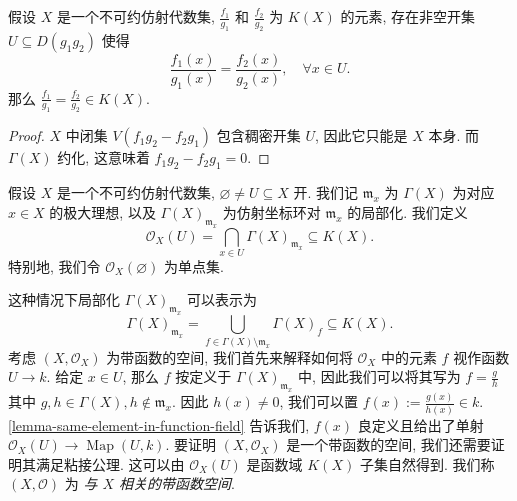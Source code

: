 \begin{lemma}
  \label{lemma-same-element-in-function-field}
  假设 \( X \) 是一个不可约仿射代数集, \( \frac{f_1}{g_1} \) 和 \(
  \frac{f_2}{g_2} \) 为 \( K(X) \) 的元素, 存在非空开集 \( U \subseteq
  D(g_1 g_2) \) 使得
  \[
    \frac{f_1(x)}{g_1(x)} = \frac{f_2(x)}{g_2(x)},\quad \forall x \in U.
  \]
  那么 \( \frac{f_1}{g_1} = \frac{f_2}{g_2} \in K(X) \).
\end{lemma}
\begin{proof}
  \( X \) 中闭集 \( V(f_1 g_2 - f_2 g_1) \) 包含稠密开集 \( U \), 因此它只能是
  \( X \) 本身. 而 \( \Gamma(X) \) 约化, 这意味着 \( f_1 g_2 - f_2 g_1 = 0 \).
\end{proof}

假设 \( X \) 是一个不可约仿射代数集, \( \varnothing \neq U \subseteq X \) 开.
我们记 \( \mathfrak{m}_x \) 为 \( \Gamma(X) \) 为对应 \( x \in X \) 的极大理想,
以及 \( \Gamma(X)_{\mathfrak{m}_x} \) 为仿射坐标环对 \( \mathfrak{m}_x \)
的局部化. 我们定义
\[
  \mathscr{O}_X(U) = \bigcap_{x \in U}\Gamma(X)_{\mathfrak{m}_x} \subseteq K(X).
\]
特别地, 我们令 \( \mathscr{O}_X(\varnothing) \) 为单点集.

这种情况下局部化 \( \Gamma(X)_{\mathfrak{m}_x} \) 可以表示为
\[
  \Gamma(X)_{\mathfrak{m}_x} = \bigcup_{f \in \Gamma(X) \setminus
  \mathfrak{m}_x} \Gamma(X)_f \subseteq K(X).
\]
考虑 \( (X, \mathscr{O}_X) \) 为带函数的空间, 我们首先来解释如何将 \(
\mathscr{O}_X \) 中的元素 \( f \) 视作函数 \( U \to k \). 给定 \( x \in U \),
那么 \( f \) 按定义于 \( \Gamma(X)_{\mathfrak{m}_x} \) 中, 因此我们可以将其写为
\( f = \frac{g}{h} \) 其中 \( g, h \in \Gamma(X), h \notin \mathfrak{m}_x \).
因此 \( h(x) \neq 0 \), 我们可以置 \( f(x) := \frac{g(x)}{h(x)} \in k \).
\cref{lemma-same-element-in-function-field} 告诉我们, \( f(x) \)
良定义且给出了单射 \( \mathscr{O}_X(U) \to \operatorname{Map}(U, k) \).
要证明 \( (X, \mathscr{O}_X) \) 是一个带函数的空间,
我们还需要证明其满足粘接公理. 这可以由 \( \mathscr{O}_X(U) \) 是函数域 \(
K(X) \) 子集自然得到. 我们称 \( (X, \mathscr{O}) \) 为 \emph{与 \( X \)
相关的带函数空间}.

